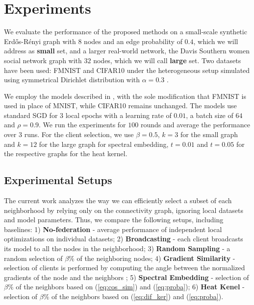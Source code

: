 \documentclass[journal]{IEEEtran}
\begin{document}
\section{Experiments}
\label{sec:exper}

We evaluate the performance of the proposed methods on a small-scale synthetic Erdős-Rényi graph \cite{random_graph} with 8 nodes and an edge probability of $0.4$, which we will address as \textbf{small} set, and a larger real-world network, the Davis Southern women social network graph \cite{south_graph} with $32$ nodes, which we will call \textbf{large} set. Two datasets have been used: FMNIST and CIFAR10 under the heterogeneous setup simulated using symmetrical Dirichlet distribution with $\alpha=0.3$ \cite{dir}.

We employ the models described in \cite{FL}, with the sole modification that FMNIST is used in place of MNIST, while CIFAR10 remains unchanged. The models use standard SGD for $3$ local epochs with a learning rate of $0.01$, a batch size of $64$ and $\rho=0.9$. We run the experiments for $100$ rounds and average the performance over $3$ runs. For the client selection, we use $\beta=0.5$, $k=3$ for the small graph and $k=12$ for the large graph for spectral embedding, $t=0.01$ and $t=0.05$ for the respective graphs for the heat kernel.  


\subsection{Experimental Setups}
The current work analyzes the way we can efficiently select a subset of each neighborhood by relying only on the connectivity graph, ignoring local datasets and model parameters. Thus, we compare the following setups, including baselines: 1) \textbf{No-federation} - average performance of independent local optimizations on individual datasets; 2) \textbf{Broadcasting} - each client broadcasts its model to all the nodes in the neighborhood; 3) \textbf{Random Sampling} - a random selection of $\beta \%$ of the neighboring nodes; 4) \textbf{Gradient Similarity} - selection of clients is performed by computing the angle between the normalized gradients of the node and the neighbors \cite{client_GRAD_sampling}; 5) \textbf{Spectral Embedding} - selection of $\beta \%$ of the neighbors based on (\ref{eq:cos_sim}) and (\ref{eq:proba}); 6) \textbf{Heat Kenel} - selection of $\beta \%$ of the neighbors based on (\ref{eq:dif_ker}) and (\ref{eq:proba}).
\end{document}
